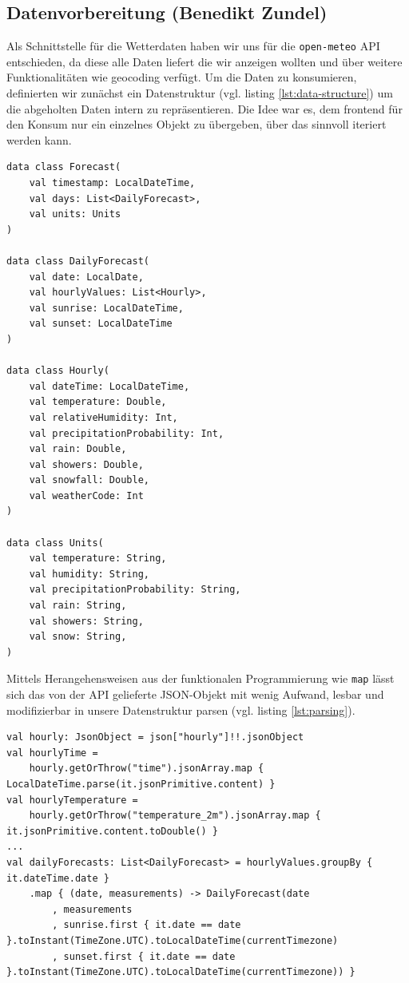 \documentclass{article}
\begin{document}
\subsection{Datenvorbereitung \small{(Benedikt Zundel)}}

Als Schnittstelle für die Wetterdaten haben wir uns für die \texttt{open-meteo} \cite{open-meteo} API entschieden, da diese alle Daten liefert die wir anzeigen wollten und über weitere Funktionalitäten wie geocoding verfügt. Um die Daten zu konsumieren, definierten wir zunächst ein Datenstruktur (vgl. listing \ref{lst:data-structure}) um die abgeholten Daten intern zu repräsentieren. Die Idee war es, dem frontend für den Konsum nur ein einzelnes Objekt zu übergeben, über das sinnvoll iteriert werden kann.

\begin{lstlisting}[label=lst:data-structure, caption=Forecast Datenstruktur]
data class Forecast(
    val timestamp: LocalDateTime,
    val days: List<DailyForecast>,
    val units: Units
)

data class DailyForecast(
    val date: LocalDate,
    val hourlyValues: List<Hourly>,
    val sunrise: LocalDateTime,
    val sunset: LocalDateTime
)

data class Hourly(
    val dateTime: LocalDateTime,
    val temperature: Double,
    val relativeHumidity: Int,
    val precipitationProbability: Int,
    val rain: Double,
    val showers: Double,
    val snowfall: Double,
    val weatherCode: Int
)

data class Units(
    val temperature: String,
    val humidity: String,
    val precipitationProbability: String,
    val rain: String,
    val showers: String,
    val snow: String,
)
\end{lstlisting}

Mittels Herangehensweisen aus der funktionalen Programmierung wie \texttt{map} lässt sich das von der API gelieferte JSON-Objekt mit wenig Aufwand, lesbar und modifizierbar in unsere Datenstruktur parsen (vgl. listing \ref{lst:parsing}).

\begin{lstlisting}[label=lst:parsing, caption=Auszug des Parsingprozesses]
val hourly: JsonObject = json["hourly"]!!.jsonObject
val hourlyTime =
    hourly.getOrThrow("time").jsonArray.map { LocalDateTime.parse(it.jsonPrimitive.content) }
val hourlyTemperature =
    hourly.getOrThrow("temperature_2m").jsonArray.map { it.jsonPrimitive.content.toDouble() }
...
val dailyForecasts: List<DailyForecast> = hourlyValues.groupBy { it.dateTime.date }
    .map { (date, measurements) -> DailyForecast(date
        , measurements
        , sunrise.first { it.date == date }.toInstant(TimeZone.UTC).toLocalDateTime(currentTimezone)
        , sunset.first { it.date == date }.toInstant(TimeZone.UTC).toLocalDateTime(currentTimezone)) }
\end{lstlisting}
\end{document}
